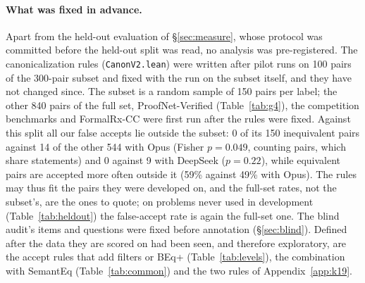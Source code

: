 \documentclass[10pt]{article}
\theoremstyle{definition}
\begin{document}
\paragraph{What was fixed in advance.} Apart from the held-out evaluation of \S\ref{sec:measure},
whose protocol was committed before the held-out split was read, no analysis was pre-registered. The canonicalization rules
(\texttt{CanonV2.lean}) were written after pilot runs on 100 pairs of the 300-pair subset and fixed
with the run on the subset itself, and they have not changed since. The subset is a random sample
of 150 pairs per label; the other 840 pairs of the full set, ProofNet-Verified
(Table~\ref{tab:g4}), the competition benchmarks and FormalRx-CC were first run after the rules
were fixed. Against this split all our false accepts lie outside the subset: 0 of its 150
inequivalent pairs against 14 of the other 544 with Opus (Fisher $p=0.049$, counting pairs, which
share statements) and 0 against 9 with DeepSeek ($p=0.22$), while equivalent pairs are accepted
more often outside it (59\% against 49\% with Opus). The rules may thus fit the pairs they were
developed on, and the full-set rates, not the subset's, are the ones to quote; on problems never
used in development (Table~\ref{tab:heldout}) the false-accept rate is again the full-set one. The blind audit's
items and questions were fixed before annotation (\S\ref{sec:blind}). Defined after the data they
are scored on had been seen, and therefore exploratory, are the accept rules that add filters or BEq+ (Table~\ref{tab:levels}), the
combination with SemantEq (Table~\ref{tab:common}) and the two rules of Appendix~\ref{app:k19}.
\end{document}
